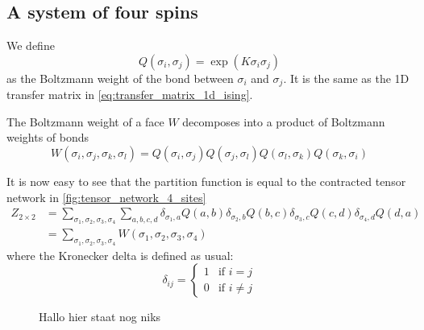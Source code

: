 
\subsection{A system of four spins}

We define
\begin{equation}
  Q(\sigma_i, \sigma_j) = \exp(K \sigma_i \sigma_j)
\end{equation}
as the Boltzmann weight of the bond between $\sigma_i$ and $\sigma_j$. It is the
same as the 1D transfer matrix in \autoref{eq:transfer_matrix_1d_ising}.

The Boltzmann weight of a face $W$ decomposes into a product of Boltzmann weights of
bonds
\begin{equation}
  W(\sigma_i, \sigma_j, \sigma_k, \sigma_l) =
  Q(\sigma_i, \sigma_j)Q(\sigma_j, \sigma_l)Q(\sigma_l, \sigma_k)Q(\sigma_k, \sigma_i)
\end{equation}

It is now easy to see that the partition function is equal to the contracted tensor
network in \autoref{fig:tensor_network_4_sites}
\begin{equation}
  \begin{split}
    Z_{2 \times 2} & =
    \sum_{\sigma_1, \sigma_2, \sigma_3, \sigma_4} \sum_{a, b, c, d}
    \delta_{\sigma_1, a} Q(a, b) \delta_{\sigma_2, b} Q(b, c)
    \delta_{\sigma_3, c} Q(c, d) \delta_{\sigma_4, d} Q(d, a) \\
    & =
    \sum_{\sigma_1, \sigma_2, \sigma_3, \sigma_4} W(\sigma_1, \sigma_2, \sigma_3, \sigma_4)
  \end{split}
\end{equation}
where the Kronecker delta is defined as usual:
\begin{equation}
  \delta_{i j} =
  \begin{cases}
    1 & \text{if } i = j \\
    0 & \text{if } i \neq j
  \end{cases}
\end{equation}

\begin{figure}
  
  \caption{Hallo hier staat nog niks}
  \label{fig:tensor_network_4_sites}
\end{figure}


